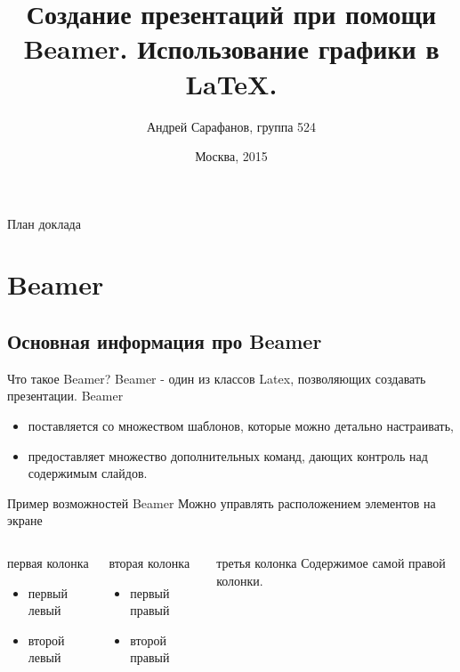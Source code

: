 \documentclass{beamer}
\title[Презентации в PDF] {Создание презентаций при помощи Beamer. 
Использование графики в \LaTeX.}
\author {Андрей Сарафанов, группа 524}
\institute {\small{
  Факультет вычислительной математики и кибернетики\\
  МГУ им. Ломоносова
}}
\date {\footnotesize{Москва, 2015}}
\begin{document}
\begin{frame}
  \titlepage
\end{frame}

\begin{frame}{План доклада}
  \tableofcontents
\end{frame}

\section{Beamer}

\subsection{Основная информация про Beamer}

\begin{frame}{Что такое Beamer?}
Beamer - один из классов Latex, позволяющих создавать презентации.
Beamer
  \begin{itemize}
  \item
    поставляется со множеством шаблонов, которые можно детально настраивать,
  \item
    предоставляет множество дополнительных команд, дающих контроль над содержимым слайдов.
  \end{itemize}
\end{frame}

\begin{frame}{
    Пример возможностей Beamer
  }{
    Можно управлять расположением элементов на экране
  }
  \begin{columns}
      \begin{block}{первая колонка}
        \begin{itemize}
          \item первый левый
          \item второй левый
        \end{itemize}
      \end{block}
      \begin{block}{вторая колонка}
        \begin{itemize}
          \item первый правый
          \item второй правый
        \end{itemize}
      \end{block}
    \pause
      \begin{block}{третья колонка}
        Содержимое самой правой колонки.
      \end{block}
  \end{columns}
\end{frame}
\end{document}
